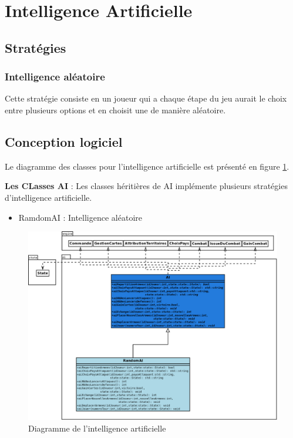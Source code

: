 \section{Intelligence Artificielle}

\subsection{Stratégies}

\subsubsection{Intelligence aléatoire}
Cette stratégie consiste en un joueur qui a chaque étape du jeu aurait le choix entre plusieurs options et en choisit une de manière aléatoire.

\newpage
\subsection{Conception logiciel}
Le diagramme des classes pour l’intelligence artificielle est présenté en figure \ref{fig:ai}.

\textbf{Les CLasses AI} : Les classes héritières de AI implémente plusieurs stratégies d'intelligence artificielle.
\begin{itemize}
    \item RamdomAI : Intelligence aléatoire
\end{itemize}

\begin{landscape}
    \begin{figure}[!htbp]
        \centering
        \includegraphics[width=17cm]{Images/ai.png}
        \caption{Diagramme de l'intelligence artificielle}
        \label{fig:ai}
    \end{figure}
\end{landscape}